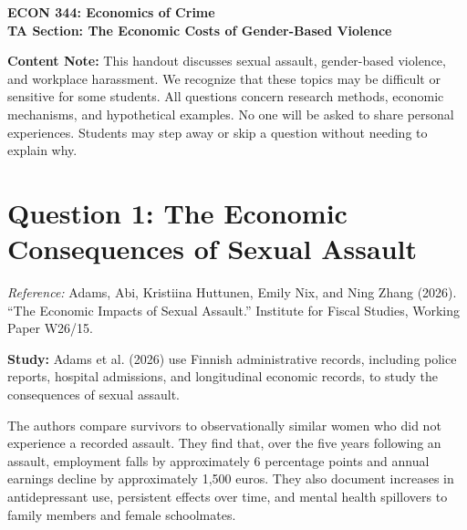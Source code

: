 \documentclass[12pt]{article}
\begin{document}
\begin{center}
\large{\textbf{ECON 344: Economics of Crime \\
TA Section: The Economic Costs of Gender-Based Violence}}
\end{center}

\medskip

\noindent\textbf{Content Note:}
This handout discusses sexual assault, gender-based violence,
and workplace harassment. We recognize that these topics
may be difficult or sensitive for some students.
All questions concern research methods, economic mechanisms,
and hypothetical examples. No one will be asked to share
personal experiences. Students may step away or skip a question
without needing to explain why.

\bigskip

\section*{Question 1: The Economic Consequences of Sexual Assault}

\noindent\textit{Reference:}
Adams, Abi, Kristiina Huttunen, Emily Nix, and Ning Zhang
(2026). ``The Economic Impacts of Sexual Assault.''
Institute for Fiscal Studies, Working Paper W26/15.

\medskip

\noindent\textbf{Study:}
Adams et al. (2026) use Finnish administrative records,
including police reports, hospital admissions, and
longitudinal economic records, to study the consequences
of sexual assault.

The authors compare survivors to observationally similar
women who did not experience a recorded assault.
They find that, over the five years following an assault,
employment falls by approximately 6 percentage points
and annual earnings decline by approximately 1,500 euros.
They also document increases in antidepressant use,
persistent effects over time, and mental health spillovers
to family members and female schoolmates.
\end{document}
